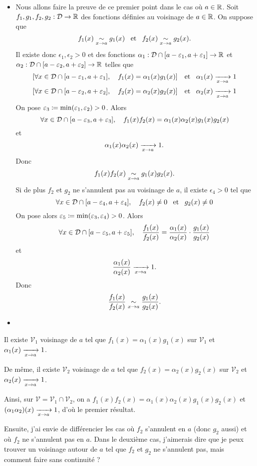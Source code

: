 \documentclass{magnoliaold}
\begin{document}
\begin{preuve}
\begin{francois}
\begin{itemize}
\item Nous allons faire la preuve de ce premier point dans le cas où $a\in\mathbb{R}$. Soit $f_1,g_1,f_2,g_2:\mathcal{D}\to\mathbb{R}$ des fonctions définies au voisinage de $a\in\mathbb{R}$. On suppose que
\[f_1(x)\underset{x\rightarrow a}{\sim} g_1(x) \quad\!\text{et}\quad\! f_2(x)\underset{x\rightarrow a}{\sim} g_2(x).\]
Il existe donc $\epsilon_1,\epsilon_2>0$ et des fonctions $\alpha_1:\mathcal{D}\cap[a-\varepsilon_1,a+\varepsilon_1]\to\mathbb{R}$ et $\alpha_2:\mathcal{D}\cap[a-\varepsilon_2,a+\varepsilon_2]\to\mathbb{R}$ telles que
\[\left[\forall x\in\mathcal{D}\cap[a-\varepsilon_1,a+\varepsilon_1],\quad f_1(x)=\alpha_1(x)g_1(x)\right] \quad\!\text{et}\quad\!
  \alpha_1(x)\xrightarrow[x\rightarrow a]{}1\]
\[\left[\forall x\in\mathcal{D}\cap[a-\varepsilon_2,a+\varepsilon_2],\quad f_2(x)=\alpha_2(x)g_2(x)\right] \quad\!\text{et}\quad\!
  \alpha_2(x)\xrightarrow[x\rightarrow a]{}1\]
On pose $\varepsilon_3\coloneqq \min(\varepsilon_1,\varepsilon_2)> 0$. Alors
\[\forall x\in\mathcal{D}\cap[a-\varepsilon_3,a+\varepsilon_3],\quad f_1(x)f_2(x)=\alpha_1(x)\alpha_2(x)g_1(x)g_2(x)\]
et
\[\alpha_1(x)\alpha_2(x)\xrightarrow[x\rightarrow a]{}1.\]
Donc
\[f_1(x)f_2(x) \underset{x\rightarrow a}{\sim} g_1(x)g_2(x).\]
Si de plus $f_2$ et $g_2$ ne s'annulent pas au voisinage de $a$, il existe $\epsilon_4>0$ tel que
\[\forall x\in\mathcal{D}\cap[a-\varepsilon_4,a+\varepsilon_4],\quad f_2(x)\neq 0 \quad\!\text{et}\quad\! g_2(x)\neq 0\]
On pose alors $\varepsilon_5\coloneqq\min(\varepsilon_3,\varepsilon_4)>0$. Alors
\[\forall x\in\mathcal{D}\cap[a-\varepsilon_5,a+\varepsilon_5],\quad \frac{f_1(x)}{f_2(x)}=\frac{\alpha_1(x)}{\alpha_2(x)}\cdot\frac{g_1(x)}{g_2(x)}\]
et 
\[\frac{\alpha_1(x)}{\alpha_2(x)}\xrightarrow[x\rightarrow a]{}1.\]
Donc
\[\frac{f_1(x)}{f_2(x)} \underset{x\rightarrow a}{\sim} \frac{g_1(x)}{g_2(x)}.\]
\item 
\end{itemize}
\end{francois}
\begin{victor}
Il existe $\mathcal{V}_1$ voisinage de $a$ tel que $f_1(x)=\alpha_1(x)g_1(x)$ sur $\mathcal{V}_1$ et $\alpha_1(x)\xrightarrow[x\rightarrow a]{}1$.

De même, il existe $\mathcal{V}_2$ voisinage de $a$ tel que $f_2(x)=\alpha_2(x)g_2(x)$ sur $\mathcal{V}_2$ et $\alpha_2(x)\xrightarrow[x\rightarrow a]{}1$.

Ainsi, sur $\mathcal{V}=\mathcal{V}_1\cap \mathcal{V}_2$, on a $f_1(x)f_2(x)=\alpha_1(x)\alpha_2(x)g_1(x)g_2(x)$ et $(\alpha_1\alpha_2)(x)\xrightarrow[x\rightarrow a]{}1$, d'où le premier résultat.

Ensuite, j'ai envie de différencier les cas où $f_2$ s'annulent en $a$ (donc $g_2$ aussi) et où $f_2$ ne s'annulent pas en $a$. Dans le deuxième cas, j'aimerais dire que je peux trouver un voisinage autour de $a$ tel que $f_2$ et $g_2$ ne s'annulent pas, mais comment faire sans continuité ?
\end{victor}
\end{preuve}
\end{document}
